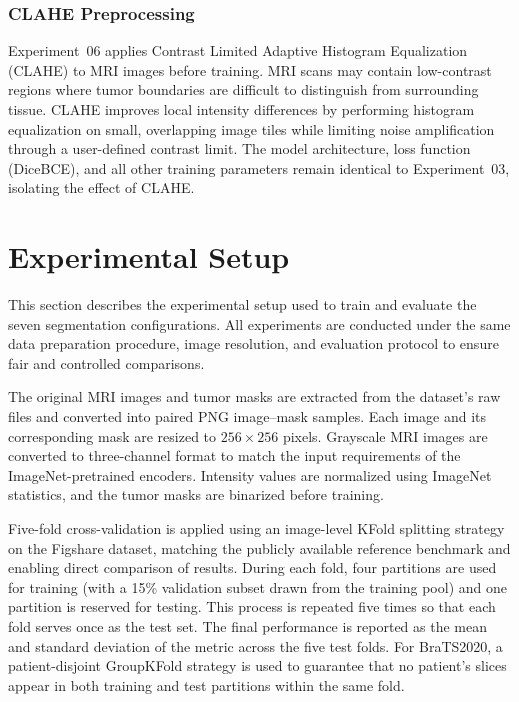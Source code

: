 \documentclass[a4paper,12pt]{article}
\begin{document}
\subsubsection{CLAHE Preprocessing}
Experiment~06 applies Contrast Limited Adaptive Histogram Equalization (CLAHE) to MRI images
before training. MRI scans may contain low-contrast regions where tumor boundaries are difficult
to distinguish from surrounding tissue. CLAHE improves local intensity differences by performing
histogram equalization on small, overlapping image tiles while limiting noise amplification
through a user-defined contrast limit. The model architecture, loss function (DiceBCE), and all
other training parameters remain identical to Experiment~03, isolating the effect of CLAHE.


\section{Experimental Setup}
\label{sec:Experiments}

This section describes the experimental setup used to train and evaluate the seven segmentation
configurations. All experiments are conducted under the same data preparation procedure, image
resolution, and evaluation protocol to ensure fair and controlled comparisons.

The original MRI images and tumor masks are extracted from the dataset's raw files and converted
into paired PNG image--mask samples. Each image and its corresponding mask are resized to
$256 \times 256$ pixels. Grayscale MRI images are converted to three-channel format to match
the input requirements of the ImageNet-pretrained encoders. Intensity values are normalized using
ImageNet statistics, and the tumor masks are binarized before training.

Five-fold cross-validation is applied using an image-level KFold splitting strategy on the
Figshare dataset, matching the publicly available reference benchmark and enabling direct
comparison of results. During each fold, four partitions are used for training (with a 15\%
validation subset drawn from the training pool) and one partition is reserved for testing.
This process is repeated five times so that each fold serves once as the test set. The final
performance is reported as the mean and standard deviation of the metric across the five test
folds. For BraTS2020, a patient-disjoint GroupKFold strategy is used to guarantee that no
patient's slices appear in both training and test partitions within the same fold.
\end{document}

